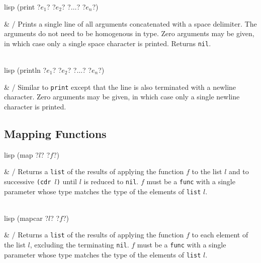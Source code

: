 \begin{funcdefs}
    \begin{minipage}[t]{\linewidth}
        \centering
        \begin{cminted}[autogobble=true, escapeinside=??]{lisp}
            (print ?$e_1$? ?$e_2$? ?$\ldots$? ?$e_n$?)
        \end{cminted}
    \end{minipage}
    & \specialf/ Prints a single line of all arguments concatenated with a space delimiter. The arguments do not need to be homogenous in type. Zero arguments may be given, in which case only a single space character is printed. Returns \texttt{nil}.
    \\ \\
    \begin{minipage}[t]{\linewidth}
        \centering
        \begin{cminted}[autogobble=true, escapeinside=??]{lisp}
            (println ?$e_1$? ?$e_2$? ?$\ldots$? ?$e_n$?)
        \end{cminted}
    \end{minipage}
    & \specialf/ Similar to \texttt{print} except that the line is also terminated with a newline character. Zero arguments may be given, in which case only a single newline character is printed.
\end{funcdefs}

\subsection{Mapping Functions}
\begin{funcdefs}
    \begin{minipage}[t]{\linewidth}
        \centering
        \begin{cminted}[autogobble=true, escapeinside=??]{lisp}
            (map ?$l$? ?$f$?)
        \end{cminted}
    \end{minipage}
    & \specialf/ Returns a \texttt{list} of the results of applying the function $f$ to the list $l$ and to successive \texttt{(cdr $l$)} until $l$ is reduced to \texttt{nil}. $f$ must be a \texttt{func} with a single parameter whose type matches the type of the elements of \texttt{list} $l$.
    \\ \\
    \begin{minipage}[t]{\linewidth}
        \centering
        \begin{cminted}[autogobble=true, escapeinside=??]{lisp}
            (mapcar ?$l$? ?$f$?)
        \end{cminted}
    \end{minipage}
    & \specialf/ Returns a \texttt{list} of the results of applying the function $f$ to each element of the list $l$, excluding the terminating \texttt{nil}. $f$ must be a \texttt{func} with a single parameter whose type matches the type of the elements of \texttt{list} $l$.
\end{funcdefs}
